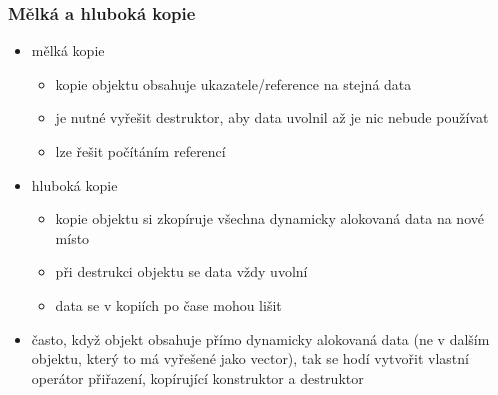 \subsubsection*{Mělká a hluboká kopie}
\begin{itemize}
	\item mělká kopie
	\begin{itemize}
		\item kopie objektu obsahuje ukazatele/reference na stejná data
		\item je nutné vyřešit destruktor, aby data uvolnil až je nic nebude používat
		\item lze řešit počítáním referencí
	\end{itemize}
	\item hluboká kopie
	\begin{itemize}
		\item kopie objektu si zkopíruje všechna dynamicky alokovaná data na nové místo
		\item při destrukci objektu se data vždy uvolní
		\item data se v kopiích po čase mohou lišit
	\end{itemize}
	\item často, když objekt obsahuje přímo dynamicky alokovaná data (ne v dalším objektu, který to má vyřešené jako vector), tak se hodí vytvořit vlastní operátor přiřazení, kopírující konstruktor a destruktor
\end{itemize}